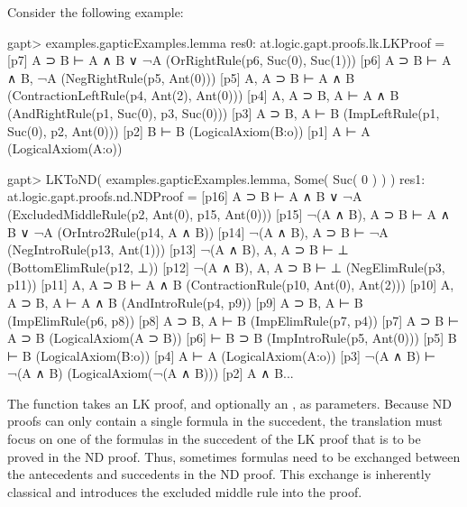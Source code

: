 \documentclass[a4paper,11pt]{article}
\newcommand{\cli}[1]{{\ttfamily {#1}}}
\begin{document}
Consider the following example:
\begin{clilisting}
gapt> examples.gapticExamples.lemma
res0: at.logic.gapt.proofs.lk.LKProof =
[p7] A ⊃ B ⊢ A ∧ B ∨ ¬A    (OrRightRule(p6, Suc(0), Suc(1)))
[p6] A ⊃ B ⊢ A ∧ B, ¬A    (NegRightRule(p5, Ant(0)))
[p5] A, A ⊃ B ⊢ A ∧ B    (ContractionLeftRule(p4, Ant(2), Ant(0)))
[p4] A, A ⊃ B, A ⊢ A ∧ B    (AndRightRule(p1, Suc(0), p3, Suc(0)))
[p3] A ⊃ B, A ⊢ B    (ImpLeftRule(p1, Suc(0), p2, Ant(0)))
[p2] B ⊢ B    (LogicalAxiom(B:o))
[p1] A ⊢ A    (LogicalAxiom(A:o))

gapt> LKToND( examples.gapticExamples.lemma, Some( Suc( 0 ) ) )
res1: at.logic.gapt.proofs.nd.NDProof =
[p16] A ⊃ B ⊢ A ∧ B ∨ ¬A    (ExcludedMiddleRule(p2, Ant(0), p15, Ant(0)))
[p15] ¬(A ∧ B), A ⊃ B ⊢ A ∧ B ∨ ¬A    (OrIntro2Rule(p14, A ∧ B))
[p14] ¬(A ∧ B), A ⊃ B ⊢ ¬A    (NegIntroRule(p13, Ant(1)))
[p13] ¬(A ∧ B), A, A ⊃ B ⊢ ⊥    (BottomElimRule(p12, ⊥))
[p12] ¬(A ∧ B), A, A ⊃ B ⊢ ⊥    (NegElimRule(p3, p11))
[p11] A, A ⊃ B ⊢ A ∧ B    (ContractionRule(p10, Ant(0), Ant(2)))
[p10] A, A ⊃ B, A ⊢ A ∧ B    (AndIntroRule(p4, p9))
[p9] A ⊃ B, A ⊢ B    (ImpElimRule(p6, p8))
[p8] A ⊃ B, A ⊢ B    (ImpElimRule(p7, p4))
[p7] A ⊃ B ⊢ A ⊃ B    (LogicalAxiom(A ⊃ B))
[p6]  ⊢ B ⊃ B    (ImpIntroRule(p5, Ant(0)))
[p5] B ⊢ B    (LogicalAxiom(B:o))
[p4] A ⊢ A    (LogicalAxiom(A:o))
[p3] ¬(A ∧ B) ⊢ ¬(A ∧ B)    (LogicalAxiom(¬(A ∧ B)))
[p2] A ∧ B...
\end{clilisting}
The \cli{LKToND} function takes an LK proof, and optionally an
\cli{Option[SequentIndex]}, as parameters.  Because ND proofs can only
contain a single formula in the succedent, the translation must focus on one
of the formulas in the succedent of the LK proof that is to be proved in the ND
proof.
Thus, sometimes formulas need to be exchanged between the antecedents and
succedents in the ND proof. This exchange is inherently classical and introduces
the excluded middle rule into the proof.
\end{document}
